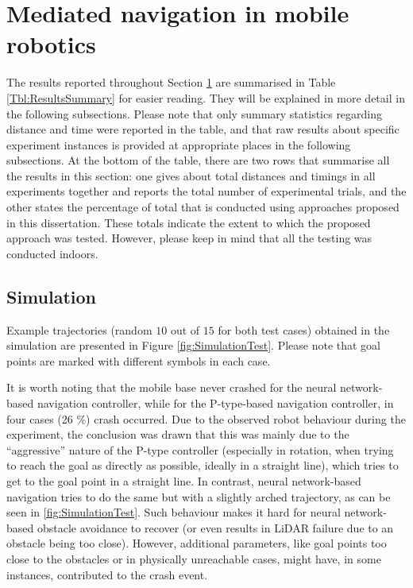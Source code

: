 \section{Mediated navigation in mobile robotics}
\label{sec:ResMediation}

The results reported throughout Section \ref{sec:ResMediation} are summarised in Table \ref{Tbl:ResultsSummary} for easier reading. They will be explained in more detail in the following subsections. Please note that only summary statistics regarding distance and time were reported in the table, and that raw results about specific experiment instances is provided at appropriate places in the following subsections. At the bottom of the table, there are two rows that summarise all the results in this section: one gives about total distances and timings in all experiments together and reports the total number of experimental trials, and the other states the percentage of total that is conducted using approaches proposed in this dissertation. These totals indicate the extent to which the proposed approach was tested. However, please keep in mind that all the testing was conducted indoors.

\subsection{Simulation} \label{sec:MediationSimResults}

Example trajectories (random $10$ out of $15$ for both test cases) obtained in the simulation are presented in Figure \ref{fig:SimulationTest}. Please note that goal points are marked with different symbols in each case.

It is worth noting that the mobile base never crashed for the neural network-based navigation controller, while for the P-type-based navigation controller, in four cases (26 \%) crash occurred. Due to the observed robot behaviour during the experiment, the conclusion was drawn that this was mainly due to the ``aggressive'' nature of the P-type controller (especially in rotation, when trying to reach the goal as directly as possible, ideally in a straight line), which tries to get to the goal point in a straight line. In contrast, neural network-based navigation tries to do the same but with a slightly arched trajectory, as can be seen in \cref{fig:SimulationTest}. Such behaviour makes it hard for neural network-based obstacle avoidance to recover (or even results in LiDAR failure due to an obstacle being too close). However, additional parameters, like goal points too close to the obstacles or in physically unreachable cases, might have, in some instances, contributed to the crash event. 

